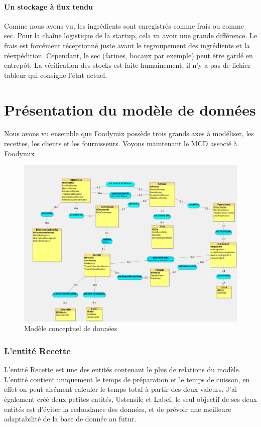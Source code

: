 \documentclass{article}
\begin{document}
\subsection{Un stockage à flux tendu}
Comme nous avons vu, les ingrédients sont enregistrés comme frais ou comme sec. Pour la chaîne logistique de la startup, cela va avoir une grande différence. Le frais est forcément réceptionné juste avant le regroupement des ingrédients et la réexpédition. Cependant, le sec (farines, bocaux par exemple) peut être gardé en entrepôt. La vérification des stocks est faite humainement, il n'y a pas de fichier tableur qui consigne l'état actuel.

\part{Présentation du modèle de données}
\setcounter{section}{0}
Nous avons vu ensemble que Foodymix possède trois grands axes à modéliser, les recettes, les clients et les fournisseurs. Voyons maintenant le MCD associé à Foodymix

\begin{figure}[h]
    \centering
    \includegraphics[width=0.9\linewidth]{images/Looping1.jpg}
    \caption{Modèle conceptuel de données}
    \label{Figure MCD}
\end{figure}

\section{L'entité Recette}
L'entité Recette est une des entités contenant le plus de relations du modèle. L'entité contient uniquement le temps de préparation et le temps de cuisson, en effet on peut aisément calculer le temps total à partir des deux valeurs.
J'ai également créé deux petites entités, Ustensile et Label, le seul objectif de ses deux entités est d'éviter la redondance des données, et de prévoir une meilleure adaptabilité de la base de donnée au futur.
\end{document}
